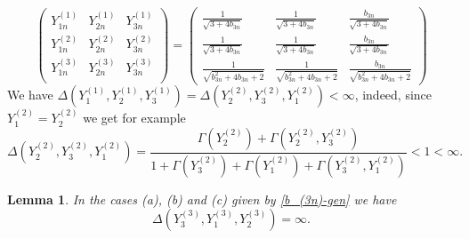 \documentclass[preprint,12pt]{elsarticle}
\newtheorem{lem}[thm]{Lemma}
\numberwithin{equation}{section}
\begin{document}
\begin{equation}
\label{Y^r_s(n)}
\left(\begin{array}{ccc}
Y_{1n}^{(1)}&Y_{2n}^{(1)}&Y_{3n}^{(1)}\\
Y_{1n}^{(2)}&Y_{2n}^{(2)}&Y_{3n}^{(2)}\\
Y_{1n}^{(3)}&Y_{2n}^{(3)}&Y_{3n}^{(3)}\\
 \end{array}\right)=
 \left(
\begin{array}{ccc}
\frac{1}{\sqrt{3+4b_{3n}}}&
\frac{1}{\sqrt{3+4b_{3n}}}&
\frac{b_{3n}}{\sqrt{3+4b_{3n}}}\\
\frac{1}{\sqrt{3+4b_{3n}}}&
\frac{1}{\sqrt{3+4b_{3n}}}&
\frac{b_{3n}}{\sqrt{3+4b_{3n}}}\\
\frac{1}{\sqrt{b^2_{3n}+4b_{3n}+2}}&
\frac{1}{\sqrt{b^2_{3n}+4b_{3n}+2}}&
\frac{b_{3n}}{\sqrt{b^2_{3n}+4b_{3n}+2}}
\end{array}
\right)
\end{equation}
We have $\Delta(Y_1^{(1)}, Y_2^{(1)},Y_3^{(1)})\!=\!\Delta(Y_2^{(2)}, Y_3^{(2)},Y_1^{(2)})\!<\!\infty$, indeed, since $Y_1^{(2)}\!=\!Y_2^{(2)}$ we
get for example
%
\begin{equation*}
 \Delta(Y_2^{(2)}, Y_3^{(2)},Y_1^{(2)})=
 \frac{\Gamma(Y_2^{(2)})+
 \Gamma(Y_2^{(2)},Y_3^{(2)})
 }{1+\Gamma(Y_3^{(2)})+\Gamma(Y_1^{(2)})
+\Gamma(Y_3^{(2)},Y_1^{(2)})
 }<1<\infty.
\end{equation*}
 \begin{lem}
\label{l.(111)-(011)}
In the cases (a), (b) and (c) given by \eqref{b_(3n)-gen} we have 
\begin{equation}
\label{(111)-(011)}
\Delta(Y_3^{(3)}, Y_1^{(3)},Y_2^{(3)})=\infty.
\end{equation}
\end{lem}
%
\end{document}
